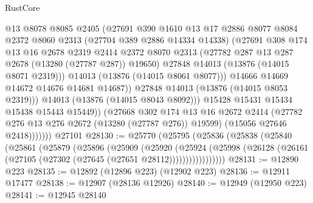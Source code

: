 \begin{lexlean}{RustCore}
\begin{coremodule}
                          @13
                          @8078
                          @8085
                          @2405
                          (@27691
                            @390
                            @1610
                            @13
                            @17
                            @2886
                            @8077
                            @8084
                            @2372
                            @8060
                            @2313
                            (@27704 @389 @2886 @14334 @14338)
                            (@27691
                              @308
                              @174
                              @13
                              @16
                              @2678
                              @2319
                              @2414
                              @2372
                              @8070
                              @2313
                              (@27782 @287 @13 @287 @2678 (@13280 (@27787 @287)) @19650)
                              @27848
                              @14013
                              (@13876 (@14015 @8071 @2319)))
                            @14013
                            (@13876 (@14015 @8061 @8077)))
                          @14666
                          @14669
                          @14672
                          @14676
                          @14681
                          @14687))
                      @27848
                      @14013
                      (@13876 (@14015 @8053 @2319)))
                    @14013
                    (@13876 (@14015 @8043 @8092)))
                  @15428
                  @15431
                  @15434
                  @15438
                  @15443
                  @15449))
              (@27668
                @302
                @174
                @13
                @16
                @2672
                @2414
                (@27782 @276 @13 @276 @2672 (@13280 (@27787 @276)) @19599)
                (@15056 @27646 @2418)))))))
    @27101
@28130 := @25770
    (@25795
      (@25836
        (@25838
          (@25840
            (@25861
              (@25879
                (@25896
                  (@25909
                    (@25920
                      (@25924
                        (@25998
                          (@26128 (@26161 (@27105 (@27302 (@27645 (@27651 @28112)))))))))))))))))
@28131 := @12890 @223
@28135 := @12892 (@12896 @223) (@12902 @223)
@28136 := @12911 @17477
@28138 := @12907 (@28136 @12926)
@28140 := @12949 (@12950 @223)
@28141 := @12945 @28140

\end{coremodule}
\end{lexlean}
